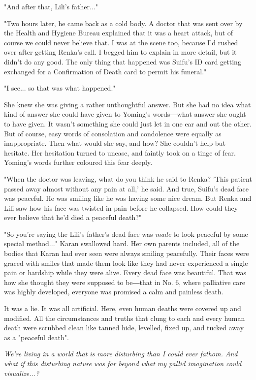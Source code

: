 "And after that, Lili's father..."

"Two hours later, he came back as a cold body. A doctor that was sent
over by the Health and Hygiene Bureau explained that it was a heart
attack, but of course we could never believe that. I was at the scene
too, because I'd rushed over after getting Renka's call. I begged him to
explain in more detail, but it didn't do any good. The only thing that
happened was Suifu's ID card getting exchanged for a Confirmation of
Death card to permit his funeral."

"I see... so that was what happened."

She knew she was giving a rather unthoughtful answer. But she had no
idea what kind of answer she could have given to Yoming's words―what
answer she ought to have given. It wasn't something she could just let
in one ear and out the other. But of course, easy words of consolation
and condolence were equally as inappropriate. Then what would she say,
and how? She couldn't help but hesitate. Her hesitation turned to
unease, and faintly took on a tinge of fear. Yoming's words further
coloured this fear deeply.

"When the doctor was leaving, what do you think he said to Renka? 'This
patient passed away almost without any pain at all,' he said. And true,
Suifu's dead face was peaceful. He was smiling like he was having some
nice dream. But Renka and Lili saw how his face was twisted in pain
before he collapsed. How could they ever believe that he'd died a
peaceful death?"

"So you're saying the Lili's father's dead face was \emph{made} to look
peaceful by some special method..." Karan swallowed hard. Her own
parents included, all of the bodies that Karan had ever seen were always
smiling peacefully. Their faces were graced with smiles that made them
look like they had never experienced a single pain or hardship while
they were alive. Every dead face was beautiful. That was how she thought
they were supposed to be―that in No. 6, where palliative care was highly
developed, everyone was promised a calm and painless death.

It was a lie. It was all artificial. Here, even human deaths were
covered up and modified. All the circumstances and truths that clung to
each and every human death were scrubbed clean like tanned hide,
levelled, fixed up, and tucked away as a "peaceful death".

\emph{We're living in a world that is more disturbing than I could ever
fathom. And what if this disturbing nature was far beyond what my pallid
imagination could visualize...?}

